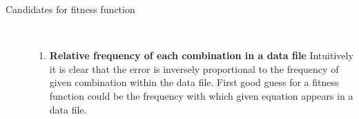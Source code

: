 \begin{description}
    \item[Candidates for fitness function] \hfill \\
    \begin{enumerate}
        \item \textbf{Relative frequency of each combination in a data file}
        Intuitively it is clear that the error is inversely proportional to the frequency of given combination within the data file.
        First good guess for a fitness function could be the frequency with which given equation appears in a data file.
    \end{enumerate}
\end{description}

